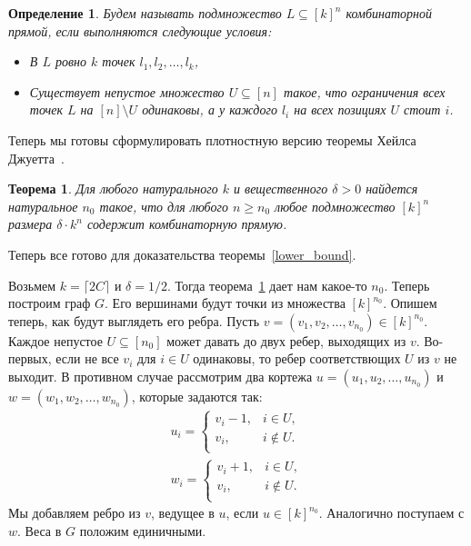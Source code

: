 \documentclass[12pt]{article}
\DeclareRobustCommand*{\CC}{\,\textendash\,\hskip 0pt}
\newtheorem{definition}{Определение}
\newtheorem{theorem}{Теорема}
\begin{document}
    \begin{definition}
        Будем называть подмножество $L \subseteq [k]^n$ \emph{комбинаторной прямой},
        если выполняются следующие условия:
        \begin{itemize}
            \item В $L$ ровно $k$ точек $l_1, l_2, \ldots, l_k$,
            \item Существует непустое множество $U \subseteq [n]$ такое, что ограничения всех точек 
            $L$ на $[n] \setminus U$ одинаковы, а у каждого $l_i$ на всех позициях $U$ стоит $i$.
        \end{itemize}
    \end{definition}

    Теперь мы готовы сформулировать плотностную версию теоремы Хейлса\CC Джуетта~\cite{P09}.
    \begin{theorem}
        \label{density_hales_jewett}
        Для любого натурального $k$ и вещественного $\delta > 0$ найдется натуральное $n_0$ такое, что для
        любого $n \geq n_0$ любое подмножество $[k]^n$ размера $\delta \cdot k^n$ содержит комбинаторную
        прямую.
    \end{theorem}

    Теперь все готово для доказательства теоремы~\ref{lower_bound}.

    Возьмем $k = \lceil 2C \rceil$ и $\delta = 1/2$. Тогда теорема~\ref{density_hales_jewett}
    дает нам какое-то $n_0$. Теперь построим граф $G$. Его вершинами будут точки из множества
    $[k]^{n_0}$.
    Опишем теперь, как будут выглядеть его ребра. Пусть $v = (v_1, v_2, \ldots, v_{n_0}) \in [k]^{n_0}$.
    Каждое непустое $U \subseteq [n_0]$ может давать до двух ребер, выходящих из $v$.
    Во-первых, если не все $v_i$ для $i \in U$ одинаковы, то ребер соответствющих $U$ из $v$
    не выходит.
    В противном случае рассмотрим два кортежа
    $u = (u_1, u_2, \ldots, u_{n_0})$ и $w = (w_1, w_2, \ldots, w_{n_0})$,
    которые задаются так:
    \begin{eqnarray*}
        u_i = \begin{cases}
            v_i - 1, & i \in U,\\
            v_i, & i \notin U.\\
        \end{cases}\\
        w_i = \begin{cases}
            v_i + 1, & i \in U,\\
            v_i, & i \notin U.\\
        \end{cases}
    \end{eqnarray*}
    Мы добавляем ребро из $v$, ведущее в $u$, если $u \in [k]^{n_0}$. Аналогично поступаем с $w$.
    Веса в $G$ положим единичными.
\end{document}
